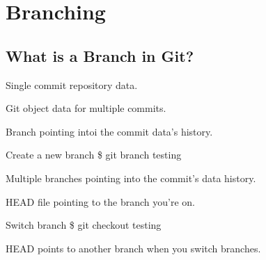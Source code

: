 \documentclass{beamer}
\begin{document}
\section{Branching}

\subsection{What is a Branch in Git?}

\begin{frame}{Single commit repository data.}
    \centering
    \hfill\vfill
\end{frame}

\begin{frame}{Git object data for multiple commits.}
    \centering
    \hfill\vfill
\end{frame}

\begin{frame}{Branch pointing intoi the commit data's history.}
    \centering
    \hfill\vfill
\end{frame}

\begin{frame}{Create a new branch}
  \$ git branch testing
\end{frame}

\begin{frame}{Multiple branches pointing into the commit's data history.}
    \centering
    \hfill\vfill
\end{frame}

\begin{frame}{HEAD file pointing to the branch you're on.}
    \centering
    \hfill\vfill
\end{frame}

\begin{frame}{Switch branch}
  \$ git checkout testing
\end{frame}

\begin{frame}{HEAD points to another branch when you switch branches.}
    \centering
    \hfill\vfill
\end{frame}
\end{document}
